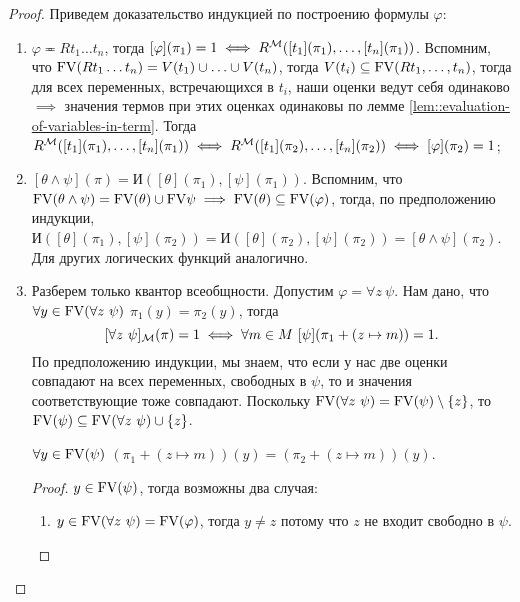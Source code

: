 \begin{proof}
    Приведем доказательство индукцией по построению формулы $\varphi$:
    \begin{enumerate}
        \item $\varphi \eqcirc R t_{1} \ldots t_{n}$, тогда $[\varphi](\pi_{1}) = 1 \iff R^{\mathcal{M}}([t_{1}](\pi_{1}), \ldots, [t_{n}](\pi_{1}))$.
        Вспомним, что $\mathrm{FV}(R t_{1} \ldots t_{n}) = V(t_{1}) \cup \ldots \cup V(t_{n})$, тогда $V(t_{i}) \subseteq \mathrm{FV}(R t_{1}, \ldots, t_{n})$, тогда для всех переменных, встречающихся в $t_{i}$, наши оценки ведут себя одинаково $\implies$ значения термов при этих оценках одинаковы по лемме \ref{lem::evaluation-of-variables-in-term}.
        Тогда $R^{\mathcal{M}}([t_{1}](\pi_{1}), \ldots, [t_{n}](\pi_{1})) \iff R^{\mathcal{M}}([t_{1}](\pi_{2}), \ldots, [t_{n}](\pi_{2})) \iff [\varphi](\pi_{2}) = 1$;
        \item $[\theta \land \psi](\pi) = \text{И}([\theta](\pi_{1}), [\psi](\pi_{1}))$.
        Вспомним, что $\mathrm{FV}(\theta \land \psi) = \mathrm{FV}(\theta) \cup \mathrm{FV}{\psi} \implies \mathrm{FV}(\theta) \subseteq \mathrm{FV}(\varphi)$, тогда, по предположению индукции, $\text{И}([\theta](\pi_{1}), [\psi](\pi_{2})) = \text{И}([\theta](\pi_{2}), [\psi](\pi_{2})) = [\theta \land \psi](\pi_{2})$.
        Для других логических функций аналогично.
        \item Разберем только квантор всеобщности.
        Допустим $\varphi = \forall z~ \psi$.
        Нам дано, что $\forall y \in \mathrm{FV}(\forall z~ \psi)$ $\pi_{1}(y) = \pi_{2}(y)$, тогда
        $$
            [\forall z~ \psi]_{\mathcal{M}}(\pi) = 1 \iff \forall m \in M~ [\psi](\pi_{1} + (z \mapsto m)) = 1.
        $$
        По предположению индукции, мы знаем, что если у нас две оценки совпадают на всех переменных, свободных в $\psi$, то и значения соответствующие тоже совпадают.
        Поскольку $\mathrm{FV}(\forall z~\psi) = \mathrm{FV}(\psi) \setminus \{z\}$, то $\mathrm{FV}(\psi) \subseteq \mathrm{FV}(\forall z~ \psi) \cup \{z\}$.
        \begin{statement}
            $\forall y \in \mathrm{FV}(\psi)$ $(\pi_{1} + (z \mapsto m))(y) = (\pi_{2} + (z \mapsto m))(y)$.
        \end{statement}
        \begin{proof}
            $y \in \mathrm{FV}(\psi)$, тогда возможны два случая:
            \begin{enumerate}
                \item $y \in \mathrm{FV}(\forall z~\psi) = \mathrm{FV}(\varphi)$, тогда $y \neq z$ потому что $z$ не входит свободно в $\psi$.

\end{enumerate}
\end{proof}
\end{enumerate}
\end{proof}
